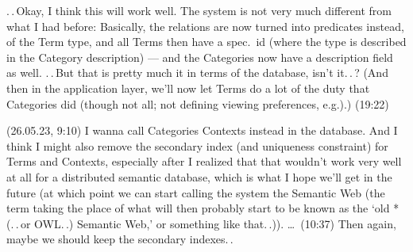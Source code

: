 \documentclass{report}
\begin{document}
.\,.\,Okay, I think this will work well. The system is not very much different from what I had before: Basically, the relations are now turned into predicates instead, of the Term type, and all Terms then have a spec.\ id (where the type is described in the Category description) --- and the Categories now have a description field as well. .\,.\,But that is pretty much it in terms of the database, isn't it.\,.\,? (And then in the application layer, we'll now let Terms do a lot of the duty that Categories did (though not all; not defining viewing preferences, e.g.).) (19:22)

(26.05.23, 9:10) I wanna call Categories Contexts instead in the database. And I think I might also remove the secondary index (and uniqueness constraint) for Terms and Contexts, especially after I realized that that wouldn't work very well at all for a distributed semantic database, which is what I hope we'll get in the future (at which point we can start calling the system the Semantic Web (the term taking the place of what will then probably start to be known as the `old *(.\,.\,or OWL.\,.) Semantic Web,' or something like that.\,.)). \ldots\ (10:37) Then again, maybe we should keep the secondary indexes.\,.

\end{document}
